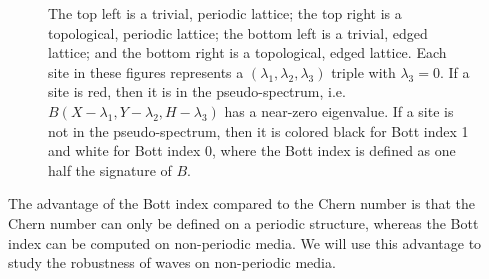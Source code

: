 \documentclass[a4paper]{article}
\begin{document}
\begin{figure}
\centering
{}%
%

%
%
\caption{The top left is a trivial, periodic lattice; the top right is a topological, periodic lattice; the bottom left is a trivial, edged lattice; and the bottom right is a topological, edged lattice.
Each site in these figures represents a $(\lambda_1,\lambda_2,\lambda_3)$ triple with $\lambda_3 = 0$.
If a site is red, then it is in the pseudo-spectrum, i.e. $B(X - \lambda_1, Y - \lambda_2, H - \lambda_3)$ has a near-zero eigenvalue.
If a site is not in the pseudo-spectrum, then it is colored black for Bott index 1 and white for Bott index 0, where the Bott index is defined as one half the signature of $B$.\\
}%
\label{fig:Bott Haldane}%
\end{figure}
The advantage of the Bott index compared to the Chern number is that the Chern number can only be defined on a periodic structure, whereas the Bott index can be computed on non-periodic media.
We will use this advantage to study the robustness of waves on non-periodic media.
\end{document}
